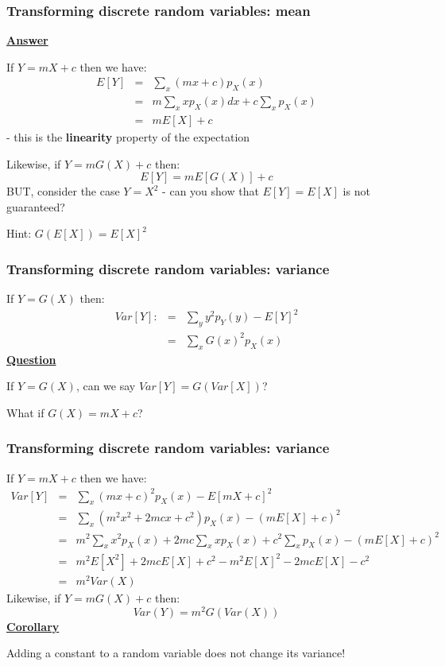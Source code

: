 \documentclass[t,8pt]{beamer}%
\begin{document}
\begin{frame}
	\frametitle{Transforming discrete random variables: mean}
    {\bf\underline{Answer}} \par
	If $Y=mX+c$ then we have:
	\begin{eqnarray*}
		E[Y]&=&\sum_x (mx+c)p_X(x)\\
		&=&m\sum_x xp_X(x)dx+c\sum_x p_X(x)\\
		&=&mE[X]+c
	\end{eqnarray*}
	- this is the {\bf linearity} property of the expectation \par
	Likewise, if $Y=mG(X)+c$ then:
	$$E[Y]=mE[G(X)]+c$$
    BUT, consider the case $Y=X^2$ - can you show that $E[Y]=E[X]$ is not guaranteed? \par
    Hint: $G(E[X])=E[X]^2$
\end{frame}

\begin{frame}
	\frametitle{Transforming discrete random variables: variance}
	If $Y=G(X)$ then:
	\begin{eqnarray*}
		Var[Y]:&=&\sum_y y^2p_Y(y)-E[Y]^2\\
		&=&\sum_x G(x)^2p_X(x)
	\end{eqnarray*}
    {\bf\underline{Question}} \par
    If $Y=G(X)$, can we say $Var[Y]=G(Var[X])$? \par
    What if $G(X)=mX+c$?
\end{frame}

\begin{frame}
	\frametitle{Transforming discrete random variables: variance}
	If $Y=mX+c$ then we have:
	\begin{eqnarray*}
		Var[Y]&=&\sum_x (mx+c)^2p_X(x)-E[mX+c]^2\\
		&=&\sum_x (m^2x^2+2mcx+c^2)p_X(x)-(mE[X]+c)^2\\
		&=&m^2\sum_x x^2p_X(x)+2mc\sum_x xp_X(x)+c^2\sum_x p_X(x)-(mE[X]+c)^2\\
            &=&m^2E[X^2]+2mcE[X]+c^2-m^2E[X]^2-2mcE[X]-c^2\\
            &=&m^2Var(X)
	\end{eqnarray*}
	Likewise, if $Y=mG(X)+c$ then:
	$$Var(Y)=m^2G(Var(X))$$
    {\bf\underline{Corollary}} \par
    Adding a constant to a random variable does not change its variance!
\end{frame}
\end{document}
